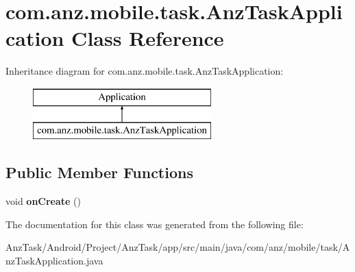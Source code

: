 \hypertarget{classcom_1_1anz_1_1mobile_1_1task_1_1_anz_task_application}{\section{com.\+anz.\+mobile.\+task.\+Anz\+Task\+Application Class Reference}
\label{classcom_1_1anz_1_1mobile_1_1task_1_1_anz_task_application}
}
Inheritance diagram for com.\+anz.\+mobile.\+task.\+Anz\+Task\+Application\+:\begin{figure}[H]
\begin{center}
\leavevmode
\includegraphics[height=2.000000cm]{classcom_1_1anz_1_1mobile_1_1task_1_1_anz_task_application}
\end{center}
\end{figure}
\subsection*{Public Member Functions}
\begin{DoxyCompactItemize}
\item 
\hypertarget{classcom_1_1anz_1_1mobile_1_1task_1_1_anz_task_application_a162b6099a5b53bf44590cf6c2f83e041}{void {\bfseries on\+Create} ()}\label{classcom_1_1anz_1_1mobile_1_1task_1_1_anz_task_application_a162b6099a5b53bf44590cf6c2f83e041}

\end{DoxyCompactItemize}


The documentation for this class was generated from the following file\+:\begin{DoxyCompactItemize}
\item 
Anz\+Task/\+Android/\+Project/\+Anz\+Task/app/src/main/java/com/anz/mobile/task/Anz\+Task\+Application.\+java\end{DoxyCompactItemize}
